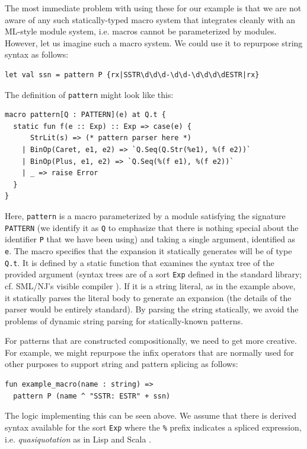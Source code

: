 The most immediate problem with using these for our example is that we are not aware of any such statically-typed macro system that integrates cleanly with an ML-style module system, i.e. macros cannot be parameterized by modules. However, let us imagine such a macro system. We could use it to repurpose string syntax  as follows:
\begin{lstlisting}[numbers=none]
let val ssn = pattern P {rx|SSTR\d\d\d-\d\d-\d\d\d\dESTR|rx}
\end{lstlisting}

The definition of \lstinline{pattern} might look like this:
\begin{lstlisting}[numbers=none]
macro pattern[Q : PATTERN](e) at Q.t {
  static fun f(e :: Exp) :: Exp => case(e) {
      StrLit(s) => (* pattern parser here *)
    | BinOp(Caret, e1, e2) => `Q.Seq(Q.Str(%e1), %(f e2))`
    | BinOp(Plus, e1, e2) => `Q.Seq(%(f e1), %(f e2))`
    | _ => raise Error
  }
}
\end{lstlisting}

Here, \lstinline{pattern} is a macro parameterized by a module satisfying the signature \lstinline{PATTERN} (we identify it as \lstinline{Q} to emphasize that there is nothing special about the identifier \lstinline{P} that we have been using) and taking a single argument, identified as \lstinline{e}. The macro specifies that the expansion it statically generates will be of type \lstinline{Q.t}. It is defined by a static function that examines the syntax tree of the provided argument (syntax trees are of a sort \lstinline{Exp} defined in the standard library; cf. SML/NJ's visible compiler \cite{SML/VisibleCompiler}). If it is a string literal, as in the example above, it statically parses the literal body to generate an expansion (the details of the parser would be entirely standard). 
By parsing the string statically, we avoid the problems of dynamic string parsing for statically-known patterns. 

For patterns that are constructed compositionally, we need to get more creative. For example, we might repurpose the infix operators that are normally used for other purposes to support string and pattern splicing as follows:

\begin{lstlisting}[numbers=none,escapechar=|]
fun example_macro(name : string) => 
  pattern P (name ^ "SSTR: ESTR" + ssn)
\end{lstlisting}

The logic implementing this can be seen above. We assume that there is derived syntax available for the sort \lstinline{Exp} where the \lstinline{%} prefix indicates a spliced expression, i.e. \emph{quasiquotation} as in Lisp \cite{Bawd99a} and Scala \cite{shabalin2013quasiquotes}. 

